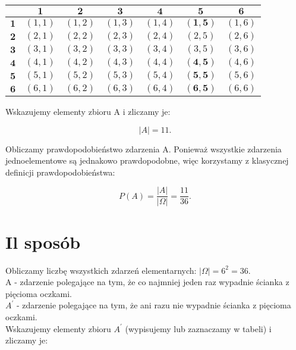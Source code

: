 \documentclass[10pt]{article}
\begin{document}
\begin{center}
\begin{tabular}{|c|c|c|c|c|c|c|}
\hline
 & $\mathbf{1}$ & $\mathbf{2}$ & $\mathbf{3}$ & $\mathbf{4}$ & $\mathbf{5}$ & $\mathbf{6}$ \\
\hline
$\mathbf{1}$ & $(1,1)$ & $(1,2)$ & $(1,3)$ & $(1,4)$ & $\mathbf{( 1 , 5 )}$ & $(1,6)$ \\
\hline
$\mathbf{2}$ & $(2,1)$ & $(2,2)$ & $(2,3)$ & $(2,4)$ & $(2,5)$ & $(2,6)$ \\
\hline
$\mathbf{3}$ & $(3,1)$ & $(3,2)$ & $(3,3)$ & $(3,4)$ & $(3,5)$ & $(3,6)$ \\
\hline
$\mathbf{4}$ & $(4,1)$ & $(4,2)$ & $(4,3)$ & $(4,4)$ & $\mathbf{( 4 , 5 )}$ & $(4,6)$ \\
\hline
$\mathbf{5}$ & $(5,1)$ & $(5,2)$ & $(5,3)$ & $(5,4)$ & $\mathbf{( 5 , 5 )}$ & $(5,6)$ \\
\hline
$\mathbf{6}$ & $(6,1)$ & $(6,2)$ & $(6,3)$ & $(6,4)$ & $\mathbf{( 6 , 5 )}$ & $(6,6)$ \\
\hline
\end{tabular}
\end{center}

Wskazujemy elementy zbioru A i zliczamy je:

$$
|A|=11 .
$$

Obliczamy prawdopodobieństwo zdarzenia A. Ponieważ wszystkie zdarzenia jednoelementowe są jednakowo prawdopodobne, więc korzystamy z klasycznej definicji prawdopodobieństwa:

$$
P(A)=\frac{|A|}{|\Omega|}=\frac{11}{36} .
$$

\section*{Il sposób}
Obliczamy liczbę wszystkich zdarzeń elementarnych: $|\Omega|=6^{2}=36$.\\
A - zdarzenie polegające na tym, że co najmniej jeden raz wypadnie ścianka z pięcioma oczkami.\\
$A^{\prime}$ - zdarzenie polegające na tym, że ani razu nie wypadnie ścianka z pięcioma oczkami.\\
Wskazujemy elementy zbioru $A^{\prime}$ (wypisujemy lub zaznaczamy w tabeli) i zliczamy je:
\end{document}
